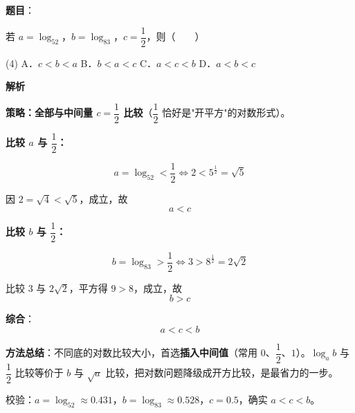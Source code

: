 \begin{answer}

\textbf{题目}：

若 $a=\log_52$，$b=\log_83$，$c=\dfrac12$，则\mbox{（　　）}

\begin{gkopts}(4)
\task A．$c<b<a$
\task B．$b<a<c$
\task C．$a<c<b$
\task D．$a<b<c$
\end{gkopts}

\textbf{解析}

\textbf{策略：全部与中间量 $c=\dfrac12$ 比较}（$\dfrac12$ 恰好是"开平方"的对数形式）。

\par\medskip

\textbf{比较 $a$ 与 $\dfrac12$：}

\nopagebreak[4]
\[a=\log_52<\frac12\iff 2<5^{\frac12}=\sqrt5\]

因 $2=\sqrt4<\sqrt5$，成立，故
\nopagebreak[4]
\[a<c\]

\par\medskip

\textbf{比较 $b$ 与 $\dfrac12$：}

\nopagebreak[4]
\[b=\log_83>\frac12\iff 3>8^{\frac12}=2\sqrt2\]

比较 $3$ 与 $2\sqrt2$，平方得 $9>8$，成立，故
\nopagebreak[4]
\[b>c\]

\par\medskip

\textbf{综合}：
\nopagebreak[4]
\[a<c<b\]

\begin{gktip}
\textbf{方法总结}：不同底的对数比较大小，首选\textbf{插入中间值}（常用 $0$、$\dfrac12$、$1$）。$\log_ab$ 与 $\dfrac12$ 比较等价于 $b$ 与 $\sqrt a$ 比较，把对数问题降级成开方比较，是最省力的一步。

校验：$a=\log_52\approx0.431$，$b=\log_83\approx0.528$，$c=0.5$，确实 $a<c<b$。
\end{gktip}


\par\medskip

\end{answer}
